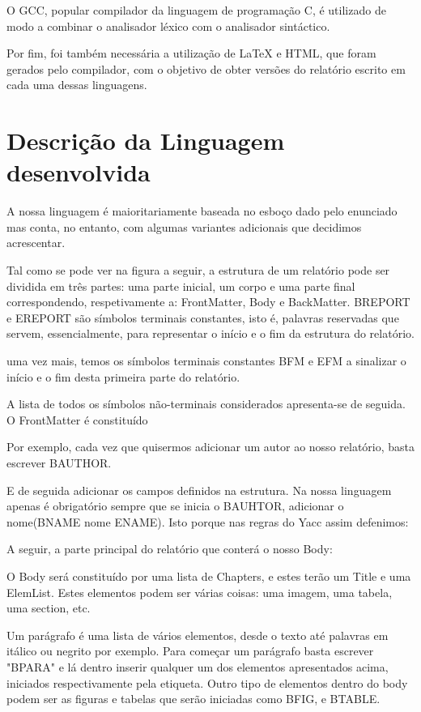 \documentclass[12pt,letterpaper]{article}
\begin{document}
O GCC, popular compilador da linguagem de programação C, é utilizado de modo a combinar o analisador léxico com o analisador sintáctico.

Por fim, foi também necessária a utilização de LaTeX e HTML, que foram gerados pelo compilador, com o objetivo de obter versões do relatório escrito em cada uma dessas linguagens.

\newpage
\section{Descrição da Linguagem desenvolvida}
A nossa linguagem é maioritariamente baseada no esboço dado pelo enunciado mas conta, no entanto, com algumas variantes adicionais que decidimos acrescentar.

Tal como se pode ver na figura a seguir, a estrutura de um relatório pode ser dividida em três partes: uma parte inicial, um corpo e uma parte final correspondendo, respetivamente a: FrontMatter, Body e BackMatter. BREPORT e EREPORT são símbolos terminais constantes, isto é, palavras reservadas que servem, essencialmente, para representar o início e o fim da estrutura do relatório.

uma vez mais, temos os símbolos terminais constantes BFM e EFM a sinalizar o início e o fim desta primeira parte do relatório.

A lista de todos os símbolos não-terminais considerados apresenta-se de seguida. O FrontMatter é constituído

Por exemplo, cada vez que quisermos adicionar um autor ao nosso relatório, basta escrever BAUTHOR.

E de seguida adicionar os campos definidos na estrutura. Na nossa linguagem apenas é obrigatório sempre que se inicia o BAUHTOR, adicionar o nome(BNAME nome ENAME). Isto porque nas regras do Yacc assim defenimos:

A seguir, a parte principal do relatório que conterá o nosso Body:

O Body será constituído por uma lista de Chapters, e estes terão um Title e uma ElemList. Estes elementos podem ser várias coisas: uma imagem, uma tabela, uma section, etc.

Um parágrafo é uma lista de vários elementos, desde o texto até palavras em itálico ou negrito por exemplo. Para começar um parágrafo basta escrever "BPARA" e lá dentro inserir qualquer um dos elementos apresentados acima, iniciados respectivamente pela etiqueta. Outro tipo de elementos dentro do body podem ser as figuras e tabelas que serão iniciadas como BFIG, e BTABLE.
\end{document}
